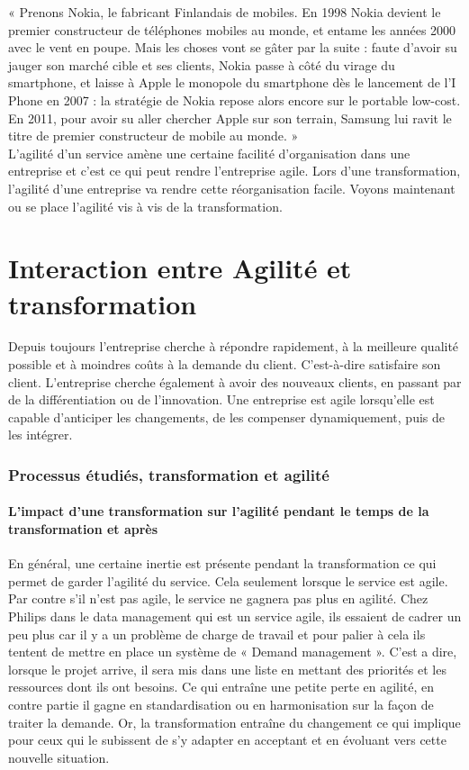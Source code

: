 \documentclass[12pt,a4paper]{article}
\begin{document}
« Prenons Nokia, le fabricant Finlandais de mobiles. En 1998 Nokia devient le premier constructeur de téléphones mobiles au monde, et entame les années 2000 avec le vent en poupe. Mais les choses vont se gâter par la suite : faute d'avoir su jauger son marché cible et ses clients, Nokia passe à côté du virage du smartphone, et laisse à Apple le monopole du smartphone dès le lancement de l'I Phone en 2007 : la stratégie de Nokia repose alors encore sur le portable low-cost. En 2011, pour avoir su aller chercher Apple sur son terrain, Samsung lui ravit le titre de premier constructeur de mobile au monde. »\\

L'agilité d'un service amène une certaine facilité d'organisation dans une entreprise et c'est ce qui peut rendre l'entreprise agile. Lors d'une transformation, l'agilité d'une entreprise va rendre cette réorganisation facile. Voyons maintenant ou se place l'agilité vis à vis de la transformation.

\newpage

\part{Interaction entre Agilité et transformation}

Depuis toujours l’entreprise cherche à répondre rapidement, à la meilleure qualité possible et à moindres coûts à la demande du client. C'est-à-dire satisfaire son client. L’entreprise cherche également à avoir des nouveaux clients, en passant par de la différentiation ou de l’innovation. Une entreprise est agile lorsqu’elle est capable d’anticiper les changements, de les compenser dynamiquement, puis de les intégrer.
\setcounter{section}{0}
\section{Processus étudiés, transformation et agilité}

\subsection{L'impact d'une transformation sur l'agilité pendant le temps de la transformation et après}

En général, une certaine inertie est présente pendant la transformation ce qui permet de garder l'agilité du service. Cela seulement lorsque le service est agile. Par contre s'il n'est pas agile, le service ne gagnera pas plus en agilité. Chez Philips dans le data management qui est un service agile, ils essaient de cadrer un peu plus car il y a un problème de charge de travail et pour palier à cela ils tentent de mettre en place un système de « Demand management ». C'est a dire, lorsque le projet arrive, il sera mis dans une liste en mettant des priorités et les ressources dont ils ont besoins. Ce qui entraîne une petite perte en agilité, en contre partie il gagne en standardisation ou en harmonisation sur la façon de traiter la demande.
Or, la transformation entraîne du changement ce qui implique pour ceux qui le subissent de s'y adapter en acceptant et en évoluant vers cette nouvelle situation.\\
\end{document}
